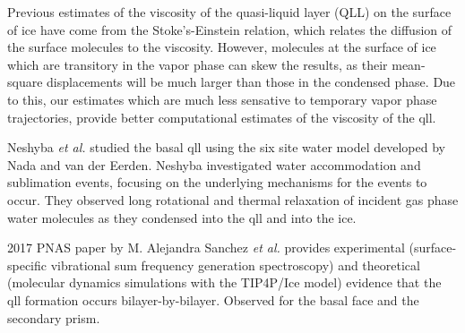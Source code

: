 Previous estimates of the viscosity of the quasi-liquid layer (QLL) on the surface of
ice have come from the Stoke's-Einstein relation, which relates the
diffusion of the surface molecules to the viscosity. However,
molecules at the surface of ice which are transitory in the vapor
phase can skew the results, as their mean-square displacements will be
much larger than those in the condensed phase. Due to this, our
estimates which are much less sensative to temporary vapor phase
trajectories, provide better computational estimates of the viscosity
of the qll.

Neshyba \textit{et al.} studied the basal qll using the six site water
model developed by Nada and van der Eerden. Neshyba investigated water
accommodation and sublimation events, focusing on the underlying
mechanisms for the events to occur. They observed long rotational and
thermal relaxation of incident gas phase water molecules as they
condensed into the qll and into the ice. \cite{Neshyba2009} 



2017 PNAS paper by M. Alejandra Sanchez \textit{et al.} provides
experimental (surface-specific vibrational sum frequency generation
spectroscopy)  and theoretical (molecular dynamics simulations with
the TIP4P/Ice model)
evidence that the qll formation occurs
bilayer-by-bilayer. Observed for the basal face and the secondary prism. 

